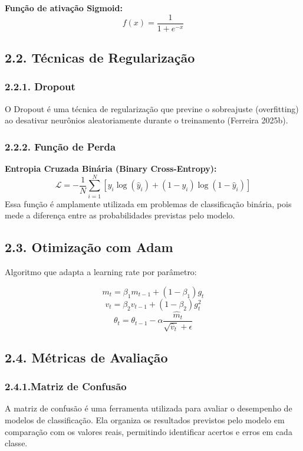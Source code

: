 \documentclass[
  oneclumn]{article}
\begin{document}
\textbf{Função de ativação Sigmoid:} \[f(x) = \frac{1}{1 + e^{-x}}\]

\subsection{2.2. Técnicas de
Regularização}\label{tuxe9cnicas-de-regularizauxe7uxe3o}

\subsubsection{2.2.1. Dropout}\label{dropout}

O Dropout é uma técnica de regularização que previne o sobreajuste
(overfitting) ao desativar neurônios aleatoriamente durante o
treinamento (Ferreira 2025b).

\subsubsection{2.2.2. Função de Perda}\label{funuxe7uxe3o-de-perda}

\textbf{Entropia Cruzada Binária (Binary Cross-Entropy):}
\[\mathcal{L} = -\frac{1}{N} \sum_{i=1}^{N} [y_i \log(\hat{y}_i) + (1-y_i) \log(1-\hat{y}_i)]\]
Essa função é amplamente utilizada em problemas de classificação
binária, pois mede a diferença entre as probabilidades previstas pelo
modelo.

\subsection{2.3. Otimização com Adam}\label{otimizauxe7uxe3o-com-adam}

Algoritmo que adapta a learning rate por parâmetro:

\[m_t = \beta_1 m_{t-1} + (1-\beta_1)g_t\]
\[v_t = \beta_2 v_{t-1} + (1-\beta_2)g_t^2\]
\[\theta_t = \theta_{t-1} - \alpha\frac{\hat{m}_t}{\sqrt{\hat{v}_t} + \epsilon}\]

\subsection{2.4. Métricas de
Avaliação}\label{muxe9tricas-de-avaliauxe7uxe3o}

\subsubsection{2.4.1.Matriz de Confusão}\label{matriz-de-confusuxe3o}

A matriz de confusão é uma ferramenta utilizada para avaliar o
desempenho de modelos de classificação. Ela organiza os resultados
previstos pelo modelo em comparação com os valores reais, permitindo
identificar acertos e erros em cada classe.
\end{document}
